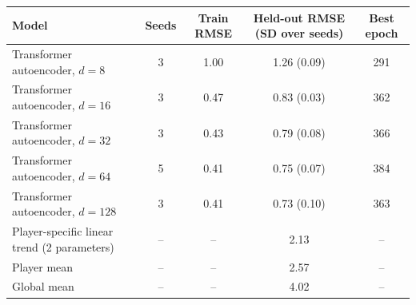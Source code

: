 \begin{tabular}{lcccc}\toprule
Model & Seeds & Train RMSE & Held-out RMSE (SD over seeds) & Best epoch \\ \midrule
Transformer autoencoder, $d=8$ & 3 & 1.00 & 1.26 (0.09) & 291 \\
Transformer autoencoder, $d=16$ & 3 & 0.47 & 0.83 (0.03) & 362 \\
Transformer autoencoder, $d=32$ & 3 & 0.43 & 0.79 (0.08) & 366 \\
Transformer autoencoder, $d=64$ & 5 & 0.41 & 0.75 (0.07) & 384 \\
Transformer autoencoder, $d=128$ & 3 & 0.41 & 0.73 (0.10) & 363 \\
\midrule Player-specific linear trend (2 parameters) & -- & -- & 2.13 & -- \\
Player mean & -- & -- & 2.57 & -- \\
Global mean & -- & -- & 4.02 & -- \\
\bottomrule\end{tabular}